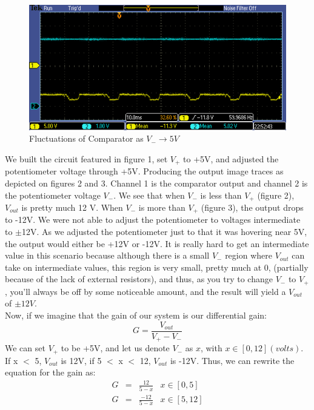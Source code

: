 \documentclass{article}
\begin{document}
    \begin{figure}[H]
        \centering
        \includegraphics[scale = 0.7]{1c.PNG}
        \caption{Fluctuations of Comparator as $V_- \rightarrow 5V$}
        \label{fig:my_label}
    \end{figure}
    We built the circuit featured in figure 1, set $V_+$ to +5V, and adjusted the potentiometer voltage through +5V. Producing the output image traces as depicted on figures 2 and 3. Channel 1 is the comparator output and channel 2 is the potentiometer voltage $V_-$. We see that when $V_-$ is less than $V_+$ (figure 2), $V_{out}$ is pretty much 12 V. When $V_-$ is more than $V_+$ (figure 3), the output drops to -12V. We were not able to adjust the potentiometer to voltages intermediate to $\pm$12V. As we adjusted the potentiometer just to that it was hovering near 5V, the output would either be +12V or -12V. It is really hard to get an intermediate value in this scenario because although there is a small $V_-$ region where $V_{out}$ can take on intermediate values, this region is very small, pretty much at 0, (partially because of the lack of external resistors), and thus, as you try to change $V_-$ to $V_+$, you'll always be off by some noticeable amount, and the result will yield a $V_{out}$ of $\pm12V$. 
    \\\indent Now, if we imagine that the gain of our system is our differential gain:
    \begin{equation}
        G = \frac{V_{out}}{V_+ - V_-}
    \end{equation}
    We can set $V_+$ to be +5V, and let us denote $V_-$ as $x$, with $x \in [0,12](volts)$. If x $<$ 5, $V_{out}$ is 12V, if 5 $<$ x $<$ 12, $V_{out}$ is -12V. Thus, we can rewrite the equation for the gain as:
    \begin{equation}
        \begin{array}{llll}
            G & = & \frac{12}{5-x} & x \in [0,5] \\
            G & = & \frac{-12}{5-x} & x \in [5,12]
        \end{array}
    \end{equation}
\end{document}
